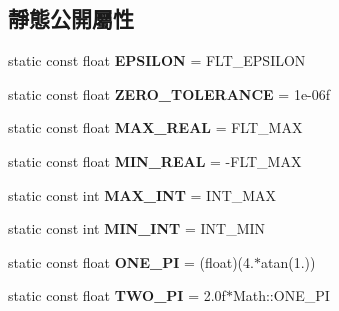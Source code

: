 \subsection*{靜態公開屬性}
\begin{DoxyCompactItemize}
\item 
static const float {\bfseries E\+P\+S\+I\+L\+ON} = F\+L\+T\+\_\+\+E\+P\+S\+I\+L\+ON\hypertarget{class_i_dream_sky_1_1_math_a5ee876d5cb049f0b3b71f3c54ed8efa0}{}\label{class_i_dream_sky_1_1_math_a5ee876d5cb049f0b3b71f3c54ed8efa0}

\item 
static const float {\bfseries Z\+E\+R\+O\+\_\+\+T\+O\+L\+E\+R\+A\+N\+CE} = 1e-\/06f\hypertarget{class_i_dream_sky_1_1_math_a2a086f9c9635d2cd14d274f66f06dfa9}{}\label{class_i_dream_sky_1_1_math_a2a086f9c9635d2cd14d274f66f06dfa9}

\item 
static const float {\bfseries M\+A\+X\+\_\+\+R\+E\+AL} = F\+L\+T\+\_\+\+M\+AX\hypertarget{class_i_dream_sky_1_1_math_afaec099767da90aa93ec3d498c0f9945}{}\label{class_i_dream_sky_1_1_math_afaec099767da90aa93ec3d498c0f9945}

\item 
static const float {\bfseries M\+I\+N\+\_\+\+R\+E\+AL} = -\/F\+L\+T\+\_\+\+M\+AX\hypertarget{class_i_dream_sky_1_1_math_a02068c349fd5f0b10f50284d35ceb63e}{}\label{class_i_dream_sky_1_1_math_a02068c349fd5f0b10f50284d35ceb63e}

\item 
static const int {\bfseries M\+A\+X\+\_\+\+I\+NT} = I\+N\+T\+\_\+\+M\+AX\hypertarget{class_i_dream_sky_1_1_math_a90b8d6d74721e38496498717f810dc79}{}\label{class_i_dream_sky_1_1_math_a90b8d6d74721e38496498717f810dc79}

\item 
static const int {\bfseries M\+I\+N\+\_\+\+I\+NT} = I\+N\+T\+\_\+\+M\+IN\hypertarget{class_i_dream_sky_1_1_math_a7f1f65b7401768e041994557cdfca249}{}\label{class_i_dream_sky_1_1_math_a7f1f65b7401768e041994557cdfca249}

\item 
static const float {\bfseries O\+N\+E\+\_\+\+PI} = (float)(4.$\ast$atan(1.))\hypertarget{class_i_dream_sky_1_1_math_ad52cde3d18fcc4f764f341ef400def94}{}\label{class_i_dream_sky_1_1_math_ad52cde3d18fcc4f764f341ef400def94}

\item 
static const float {\bfseries T\+W\+O\+\_\+\+PI} = 2.\+0f$\ast$\+Math\+::\+O\+N\+E\+\_\+\+PI\hypertarget{class_i_dream_sky_1_1_math_a52cf11c3d21a83ced7f3e73d73b438bf}{}\label{class_i_dream_sky_1_1_math_a52cf11c3d21a83ced7f3e73d73b438bf}


\end{DoxyCompactItemize}
